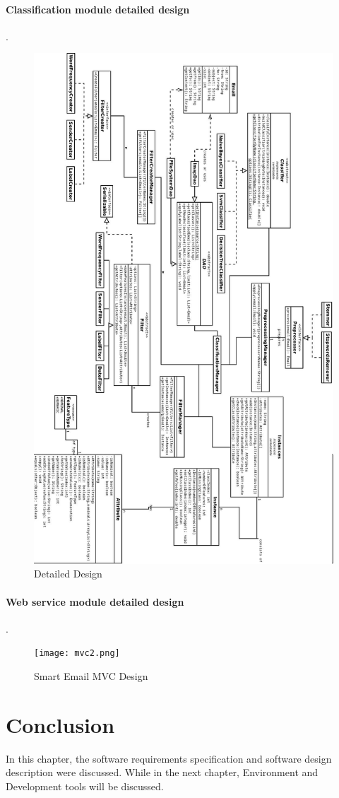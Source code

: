 \paragraph{Classification module detailed design}
.\\
\begin{figure}[H]
  \centering
  \includegraphics[width=12cm]{design.jpeg}
  \caption[Detailed Design] {Detailed Design}
\end{figure}



\paragraph{Web service module detailed design}
.\\
\begin{figure}[H]
  \centering
  \texttt{[image: mvc2.png]}
  \caption[Smart Email MVC Design]{Smart Email MVC Design}
\end{figure}


\section{Conclusion}
In this chapter, the software requirements specification and software design
description were discussed. While in the next chapter, Environment and 
Development tools will be discussed.
